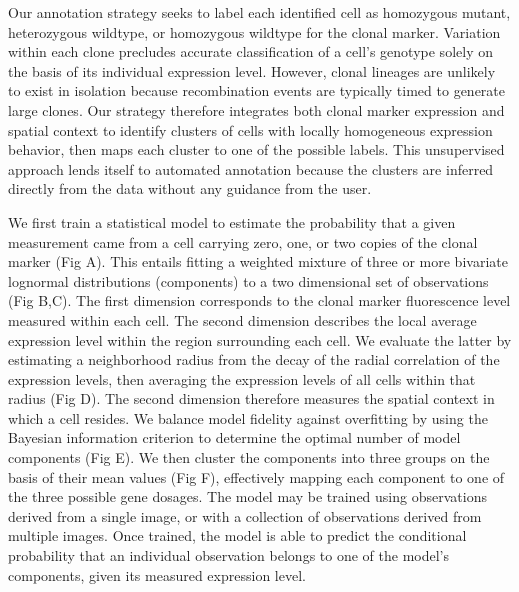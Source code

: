 \documentclass[10pt,letterpaper]{article}
\begin{document}
Our annotation strategy seeks to label each identified cell as homozygous mutant, heterozygous wildtype, or homozygous wildtype for the clonal marker. Variation within each clone precludes accurate classification of a cell's genotype solely on the basis of its individual expression level. However, clonal lineages are unlikely to exist in isolation because recombination events are typically timed to generate large clones. Our strategy therefore integrates both clonal marker expression and spatial context to identify clusters of cells with locally homogeneous expression behavior, then maps each cluster to one of the possible labels. This unsupervised approach lends itself to automated annotation because the clusters are inferred directly from the data without any guidance from the user.

We first train a statistical model to estimate the probability that a given measurement came from a cell carrying zero, one, or two copies of the clonal marker (Fig A). This entails fitting a weighted mixture of three or more bivariate lognormal distributions (components) to a two dimensional set of observations (Fig B,C). The first dimension corresponds to the clonal marker fluorescence level measured within each cell. The second dimension describes the local average expression level within the region surrounding each cell. We evaluate the latter by estimating a neighborhood radius from the decay of the radial correlation of the expression levels, then averaging the expression levels of all cells within that radius (Fig D). The second dimension therefore measures the spatial context in which a cell resides. We balance model fidelity against overfitting by using the Bayesian information criterion to determine the optimal number of model components (Fig E). We then cluster the components into three groups on the basis of their mean values (Fig F), effectively mapping each component to one of the three possible gene dosages. The model may be trained using observations derived from a single image, or with a collection of observations derived from multiple images. Once trained, the model is able to predict the conditional probability that an individual observation belongs to one of the model's components, given its measured expression level.
\end{document}
